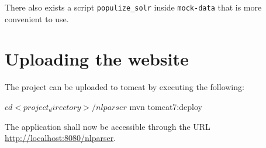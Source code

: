 
There also exists a script \texttt{populize\_solr} inside \texttt{mock-data} that is more convenient to use.

\section{Uploading the website}

The project can be uploaded to tomcat by executing the following:

\begin{terminal}
$ cd <project_directory>/nlparser
$ mvn tomcat7:deploy
\end{terminal}

The application shall now be accessible through the URL
\newline
 \url{http://localhost:8080/nlparser}.
